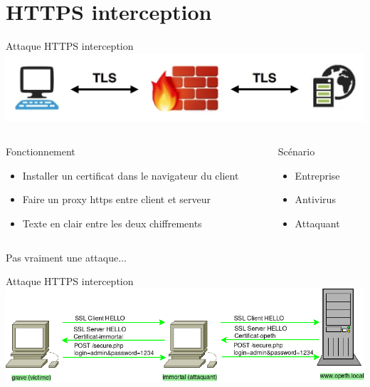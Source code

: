 \section{HTTPS interception}

\begin{frame}{Attaque HTTPS interception}
    \includegraphics[width=\linewidth]{../medias/interception-https.png}

    \hspace{10cm}

    \begin{columns}
        \begin{column}{0.7\textwidth}
            \begin{block}{Fonctionnement}
                \begin{itemize}
                    \item{Installer un certificat dans le navigateur du client}
                    \item{Faire un proxy https entre client et serveur}
                    \item{Texte en clair entre les deux chiffrements}
                \end{itemize}
            \end{block}

        \end{column}

        \begin{column}{0.3\textwidth}
            \begin{exampleblock}{Scénario}
                \begin{itemize}
                    \item{Entreprise}
                    \item{Antivirus}
                    \item{Attaquant}
                \end{itemize}
            \end{exampleblock}
        \end{column}
    \end{columns}

  \hspace{20cm}

  {\Large \centerline{Pas vraiment une attaque...}}

\end{frame}

\begin{frame}{Attaque HTTPS interception}
    \includegraphics[width=\linewidth]{../medias/https-interception/attack.png}
\end{frame}
